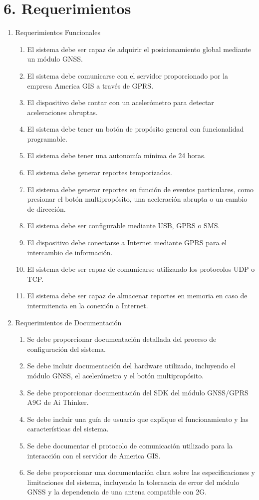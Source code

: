 \documentclass[
11pt, %
codirector, %
]{charter}
\begin{document}
\section{6. Requerimientos}
\label{sec:requerimientos}

\begin{enumerate}
\item Requerimientos Funcionales
    \begin{enumerate}
    \item El sistema debe ser capaz de adquirir el posicionamiento global mediante un módulo GNSS.
    \item El sistema debe comunicarse con el servidor proporcionado por la empresa America GIS a través de GPRS.
    \item El dispositivo debe contar con un acelerómetro para detectar aceleraciones abruptas.
    \item El sistema debe tener un botón de propósito general con funcionalidad programable.
    \item El sistema debe tener una autonomía mínima de 24 horas.
    \item El sistema debe generar reportes temporizados.
    \item El sistema debe generar reportes en función de eventos particulares, como presionar el botón multipropósito, una aceleración abrupta o un cambio de dirección.
    \item El sistema debe ser configurable mediante USB, GPRS o SMS.
    \item El dispositivo debe conectarse a Internet mediante GPRS para el intercambio de información.
    \item El sistema debe ser capaz de comunicarse utilizando los protocolos UDP o TCP.
    \item El sistema debe ser capaz de almacenar reportes en memoria en caso de intermitencia en la conexión a Internet.
    \end{enumerate}

\item Requerimientos de Documentación
    \begin{enumerate}
    \item Se debe proporcionar documentación detallada del proceso de configuración del sistema.
    \item Se debe incluir documentación del hardware utilizado, incluyendo el módulo GNSS, el acelerómetro y el botón multipropósito.
    \item Se debe proporcionar documentación del SDK del módulo GNSS/GPRS A9G de Ai Thinker.
    \item Se debe incluir una guía de usuario que explique el funcionamiento y las características del sistema.
    \item Se debe documentar el protocolo de comunicación utilizado para la interacción con el servidor de America GIS.
    \item Se debe proporcionar una documentación clara sobre las especificaciones y limitaciones del sistema, incluyendo la tolerancia de error del módulo GNSS y la dependencia de una antena compatible con 2G.
    \end{enumerate}
\end{enumerate}
\end{document}
